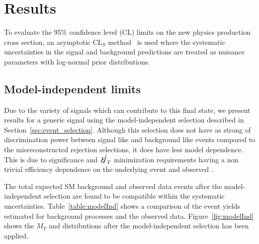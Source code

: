 \section{Results}

    To evaluate the 95$\%$ confidence level (CL) limits on the new physics production cross section, an asymptotic CL$_{S}$ method~\cite{cls,cls1} is used where the systematic uncertainties in the signal and background predictions are treated as nuisance parameters with log-normal prior distributions. %

\subsection{Model-independent limits}

  Due to the variety of signals which can contribute to this final state, we present results for a generic signal using the model-independent selection described in Section~\ref{sec:event_selection}. Although this selection does not have as strong of discrimination power between signal like and background like events compared to the misreconstructed \met rejection selections, it does have less model dependence. This is due to \met significance and $\tilde{\met}$ minimization requirements having a non trivial efficiency dependence on the underlying event and observed \met.

  The total expected SM background and observed data events after the model-independent selection are found to be compatible within the systematic uncertainties. Table~\ref{table:modelInd} shows a comparison of the event yields estimated for background processes and the observed data. Figure~\ref{fig:modelInd} shows the $M_{T}$ and \met distributions after the model-independent selection has been applied.


